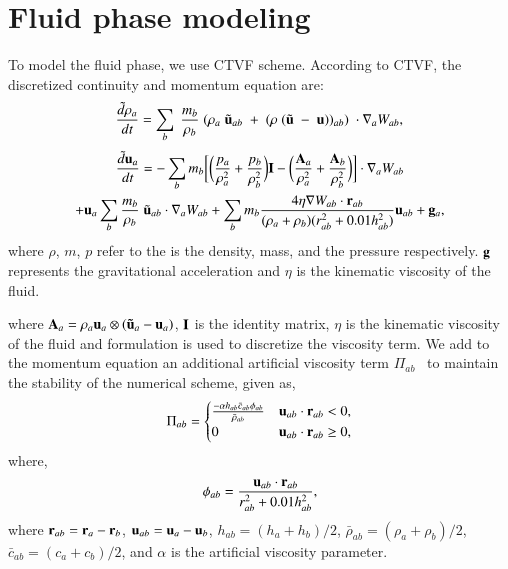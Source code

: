 \FloatBarrier%
\section{Fluid phase modeling}
\label{sec:rfc:fluid-dynamics}
To model the fluid phase, we use CTVF \cite{adepu2021corrected} scheme. According
to CTVF, the discretized continuity and momentum equation are:
\begin{equation}
  \label{eq:sph-discretization-continuity}
  \frac{\tilde{d}\rho_a}{dt} = \sum_{b} \; \frac{m_b}{\rho_{b}} \; (
  \rho_{a} \; \tilde{\mathbf{u}}_{ab} \; + \;
  (\rho \; (\tilde{\mathbf{u}} \; - \;
  \mathbf{u}))_{ab}) \; \cdot \nabla_{a} W_{ab},
\end{equation}
\begin{multline}
  \label{eq:sph-momentum-fluid}
  \frac{\tilde{d}\mathbf{u}_{a}}{dt} = - \sum_{b} m_b \bigg[
  \bigg(\frac{p_a}{\rho_a^2} + \frac{p_b}{\rho_b^2}\bigg) \mathbf{I} -
  \bigg(\frac{\mathbf{A}_a}{\rho_a^2} + \frac{\mathbf{A}_b}{\rho_b^2}
  \bigg) \bigg]
  \cdot \nabla_{a} W_{ab} \\
  + \mathbf{u}_{a} \sum_{b} \frac{m_b}{\rho_{b}} \; \tilde{\mathbf{u}}_{ab} \cdot
  \nabla_{a} W_{ab} + \sum_{b} m_b \frac{4 \eta \nabla W_{ab}\cdot
    \mathbf{r}_{ab}}{(\rho_a + \rho_b) (r_{ab}^2 + 0.01 h_{ab}^2)} \mathbf{u}_{ab} +
  \mathbf{g}_{a},
\end{multline}
where $\rho$, $m$, $p$ refer to the is the density, mass, and the pressure
respectively. $\mathbf{g}$ represents the gravitational acceleration and $\eta$ is
the kinematic viscosity of the fluid.


where $\mathbf{A}_a = \rho_a \mathbf{u}_a \otimes (\mathbf{\tilde{u}}_a - \mathbf{u}_a)$,
$\mathbf{I}$ is the identity matrix, $\eta$ is the kinematic viscosity of the fluid
and \cite{morris1997modeling} formulation is used to discretize the viscosity
term. We add to the momentum equation an additional artificial viscosity term
$\Pi_{ab}$~\citep{monaghan-review:2005} to maintain the stability of the
numerical scheme, given as,
\begin{align}
  \label{eq:mom-av}
  \Pi_{ab} =
  \begin{cases}
\frac{-\alpha h_{ab} \bar{c}_{ab} \phi_{ab}}{\bar{\rho}_{ab}}
  & \mathbf{u}_{ab}\cdot \mathbf{r}_{ab} < 0, \\
  0 & \mathbf{u}_{ab}\cdot \mathbf{r}_{ab} \ge 0,
\end{cases}
\end{align}
where,
%
\begin{equation}
  \label{eq:av-phiij}
  \phi_{ab} = \frac{\mathbf{u}_{ab} \cdot \mathbf{r}_{ab}}{r^2_{ab} + 0.01 h^2_{ab}},
\end{equation}
%
where $\mathbf{r}_{ab} = \mathbf{r}_a - \mathbf{r}_b$, $\mathbf{u}_{ab} = \mathbf{u}_a -
\mathbf{u}_b$, $h_{ab} = (h_a + h_b)/2$, $\bar{\rho}_{ab} = (\rho_a + \rho_b)/2$,
$\bar{c}_{ab} = (c_a + c_b) / 2$, and $\alpha$ is the artificial
viscosity parameter.

